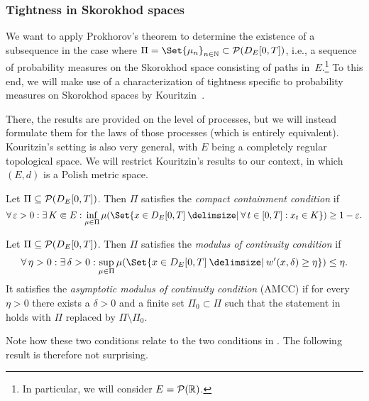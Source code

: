 \subsubsection{Tightness in Skorokhod spaces}

We want to apply Prokhorov's theorem to determine the existence of a subsequence in the case where \( \Pi = \Set{\mu_n}_{n\in\bN} \subset \cP(D_{E}[0,T]) \), i.e., a sequence of probability measures on the Skorokhod space consisting of paths in~\(E\).\footnote{In particular, we will consider \(E = \mathcal{P}(\mathbb{R})\).}
To this end, we will make use of a characterization of tightness specific to probability measures on Skorokhod spaces by Kouritzin~\cite{kouritzinTightnessProbabilityMeasures2015}.

There, the results are provided on the level of processes, but we will instead formulate them for the laws of those processes (which is entirely equivalent).
Kouritzin's setting is also very general, with \( E \) being a completely regular topological space.
We will restrict Kouritzin's results to our context, in which \((E,d)\) is a Polish metric space.

\begin{definition}[CCC]\label{def:CCC}
  Let \( \Pi \subseteq \mathcal{P}(D_{E}[0,T]) \).
  Then \( \Pi \) satisfies the \textit{compact containment condition} if
  \begin{equation}
    \forall \eps > 0 : \exists K \Subset E : \inf_{\mu \in \Pi} \mu(\Set{x \in D_E[0,T] \given \forall t \in [0,T] : x_t \in K}) \geq 1 - \eps.
  \end{equation}
\end{definition}

\begin{definition}[MCC]\label{def:MCC}
  Let \( \Pi \subseteq \mathcal{P}(D_{E}[0,T]) \).
  Then \( \Pi \) satisfies the \textit{modulus of continuity condition} if
  \begin{equation}\label{eq:MCC}
    \forall \eta > 0 : \exists \delta > 0 : \sup_{\mu \in \Pi} \mu(\Set{x \in D_E[0,T] \given w'(x,\delta) \geq \eta}) \leq \eta.
  \end{equation}
  It satisfies the \textit{asymptotic modulus of continuity condition} (AMCC) if for every \( \eta > 0 \) there exists a \( \delta > 0 \) and a finite set \( \Pi_0 \subset \Pi \) such that the statement in  holds with \( \Pi \) replaced by \( \Pi \setminus \Pi_0 \).
\end{definition}

Note how these two conditions relate to the two conditions in .
The following result is therefore not surprising.

